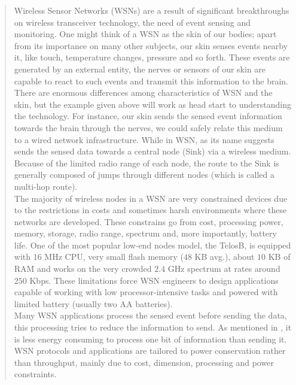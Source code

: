 \begin{quotation}
Wireless Sensor Networks (WSNs) are a result of significant breakthroughs on wireless transceiver technology, the need of event sensing and monitoring. One might think of a WSN as the skin of our bodies; apart from its importance on many other subjects, our skin senses events nearby it, like touch, temperature changes, pressure and so forth. These events are generated by an external entity, the nerves or sensors of our skin are capable to react to such events and transmit this information to the brain. \\

There are enormous differences among characteristics of WSN and the skin, but the example given above will work as head start to understanding the technology. For instance, our skin sends the sensed event information towards the brain through the nerves, we could safely relate this medium to a wired network infrastructure. While in WSN, as its name suggests sends the sensed data towards a central node (Sink) via a wireless medium. Because of the limited radio range of each node, the route to the Sink is generally composed of jumps through different nodes (which is called a multi-hop route).\\

The majority of wireless nodes in a WSN are very constrained devices due to the restrictions in costs and sometimes harsh environments where these networks are developed. These constrains go from cost, processing power, memory, storage, radio range, spectrum and, more importantly, battery life. One of the most popular low-end nodes model, the TelosB, is equipped with $16$ MHz CPU, very small flash memory ($48$ KB avg.), about $10$ KB of RAM and works on the very crowded $2.4$ GHz spectrum at rates around $250$ Kbps. These limitations force WSN engineers to design applications capable of working with low processor-intensive tasks and powered with limited battery (usually two AA batteries).\\

Many WSN applications process the sensed event before sending the data, this processing tries to reduce the information to send. As mentioned in \cite{akyildiz2010wireless}, it is less energy consuming to process one bit of information than sending it. WSN protocols and applications are tailored to power conservation rather than throughput, mainly due to cost, dimension, processing and power constraints.\\


\end{quotation}
